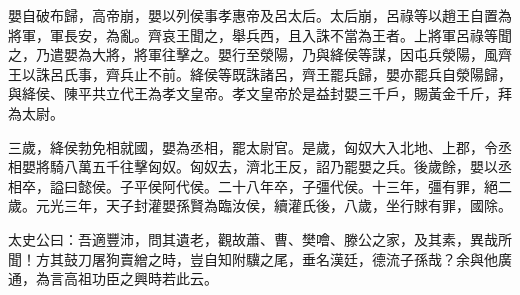 \begin{pinyinscope}
嬰自破布歸，高帝崩，嬰以列侯事孝惠帝及呂太后。太后崩，呂祿等以趙王自置為將軍，軍長安，為亂。齊哀王聞之，舉兵西，且入誅不當為王者。上將軍呂祿等聞之，乃遣嬰為大將，將軍往擊之。嬰行至滎陽，乃與絳侯等謀，因屯兵滎陽，風齊王以誅呂氏事，齊兵止不前。絳侯等既誅諸呂，齊王罷兵歸，嬰亦罷兵自滎陽歸，與絳侯、陳平共立代王為孝文皇帝。孝文皇帝於是益封嬰三千戶，賜黃金千斤，拜為太尉。

三歲，絳侯勃免相就國，嬰為丞相，罷太尉官。是歲，匈奴大入北地、上郡，令丞相嬰將騎八萬五千往擊匈奴。匈奴去，濟北王反，詔乃罷嬰之兵。後歲餘，嬰以丞相卒，謚曰懿侯。子平侯阿代侯。二十八年卒，子彊代侯。十三年，彊有罪，絕二歲。元光三年，天子封灌嬰孫賢為臨汝侯，續灌氏後，八歲，坐行賕有罪，國除。

太史公曰：吾適豐沛，問其遺老，觀故蕭、曹、樊噲、滕公之家，及其素，異哉所聞！方其鼓刀屠狗賣繒之時，豈自知附驥之尾，垂名漢廷，德流子孫哉？余與他廣通，為言高祖功臣之興時若此云。


\end{pinyinscope}